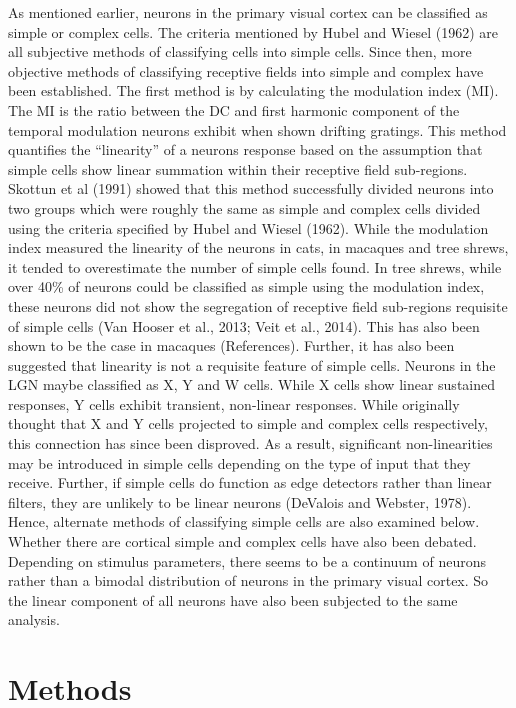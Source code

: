 	As mentioned earlier, neurons in the primary visual cortex can be classified as simple or complex cells. The criteria mentioned by Hubel and Wiesel (1962) are all subjective methods of classifying cells into simple cells. Since then, more objective methods of classifying receptive fields into simple and complex have been established. The first method is by calculating the modulation index (MI). The MI is the ratio between the DC and first harmonic component of the temporal modulation neurons exhibit when shown drifting gratings. This method quantifies the “linearity” of a neurons response based on the assumption that simple cells show linear summation within their receptive field sub-regions. Skottun et al (1991) showed that this method successfully divided neurons into two groups which were roughly the same as simple and complex cells divided using the criteria specified by Hubel and Wiesel (1962).
	While the modulation index measured the linearity of the neurons in cats, in macaques and tree shrews, it tended to overestimate the number of simple cells found. In tree shrews, while over 40\% of neurons could be classified as simple using the modulation index, these neurons did not show the segregation of receptive field sub-regions requisite of simple cells (Van Hooser et al., 2013; Veit et al., 2014). This has also been shown to be the case in macaques (References). 
	Further, it has also been suggested that linearity is not a requisite feature of simple cells. Neurons in the LGN maybe classified as X, Y and W cells. While X cells show linear sustained responses, Y cells exhibit transient, non-linear responses. While originally thought that X and Y cells projected to simple and complex cells respectively, this connection has since been disproved. As a result, significant non-linearities may be introduced in simple cells depending on the type of input that they receive. Further, if simple cells do function as edge detectors rather than linear filters, they are unlikely to be linear neurons (DeValois and Webster, 1978). Hence, alternate methods of classifying simple cells are also examined below. 
	Whether there are cortical simple and complex cells have also been debated. Depending on stimulus parameters, there seems to be a continuum of neurons rather than a bimodal distribution of neurons in the primary visual cortex. So the linear component of all neurons have also been subjected to the same analysis.
	
	\section{Methods}
	
